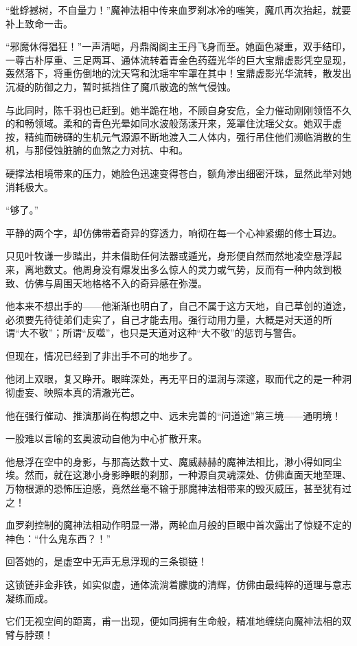 “蚍蜉撼树，不自量力！”魔神法相中传来血罗刹冰冷的嗤笑，魔爪再次抬起，就要补上致命一击。

“邪魔休得猖狂！”一声清喝，丹鼎阁阁主王丹飞身而至。她面色凝重，双手结印，一尊古朴厚重、三足两耳、通体流转着青金色药蕴光华的巨大宝鼎虚影凭空显现，轰然落下，将重伤倒地的沈天穹和沈瑶牢牢罩在其中！宝鼎虚影光华流转，散发出沉凝的防御之力，暂时抵挡住了魔爪散逸的煞气侵蚀。

与此同时，陈千羽也已赶到。她半跪在地，不顾自身安危，全力催动刚刚领悟不久的和畅领域。柔和的青色光晕如同水波般荡漾开来，笼罩住沈瑶父女。她双手虚按，精纯而磅礴的生机元气源源不断地渡入二人体内，强行吊住他们濒临消散的生机，与那侵蚀脏腑的血煞之力对抗、中和。

硬撑法相境带来的压力，她脸色迅速变得苍白，额角渗出细密汗珠，显然此举对她消耗极大。

“够了。”

平静的两个字，却仿佛带着奇异的穿透力，响彻在每一个心神紧绷的修士耳边。

只见叶牧谦一步踏出，并未借助任何法器或遁光，身形便自然而然地凌空悬浮起来，离地数丈。他周身没有爆发出多么惊人的灵力或气势，反而有一种内敛到极致、仿佛与周围天地格格不入的奇异感在弥漫。

他本来不想出手的——他渐渐也明白了，自己不属于这方天地，自己草创的道途，必须要先待徒弟们走实了，自己才能去用。强行动用力量，大概是对天道的所谓“大不敬”；所谓“反噬”，也只是天道对这种“大不敬”的惩罚与警告。

但现在，情况已经到了非出手不可的地步了。

他闭上双眼，复又睁开。眼眸深处，再无平日的温润与深邃，取而代之的是一种洞彻虚妄、映照本真的清澈光芒。

他在强行催动、推演那尚在构想之中、远未完善的“问道途”第三境——通明境！

一股难以言喻的玄奥波动自他为中心扩散开来。

他悬浮在空中的身影，与那高达数十丈、魔威赫赫的魔神法相比，渺小得如同尘埃。然而，就在这渺小身影睁眼的刹那，一种源自灵魂深处、仿佛直面天地至理、万物根源的恐怖压迫感，竟然丝毫不输于那魔神法相带来的毁灭威压，甚至犹有过之！

血罗刹控制的魔神法相动作明显一滞，两轮血月般的巨眼中首次露出了惊疑不定的神色：“什么鬼东西？！”

回答她的，是虚空中无声无息浮现的三条锁链！

这锁链非金非铁，如实似虚，通体流淌着朦胧的清辉，仿佛由最纯粹的道理与意志凝练而成。

它们无视空间的距离，甫一出现，便如同拥有生命般，精准地缠绕向魔神法相的双臂与脖颈！

